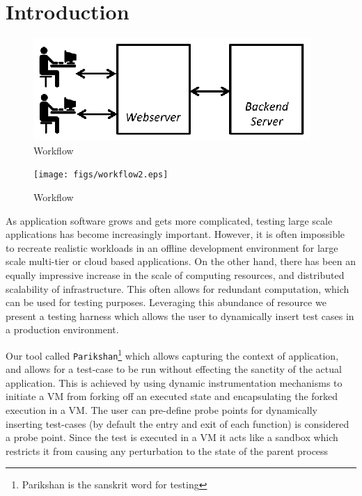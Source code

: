 
\section{Introduction}
\label{sec:intro}

\begin{figure}[t]
  \begin{center}
    \includegraphics[width=0.95\columnwidth]{figs/workflow.eps}
    \caption{Workflow}
    \label{fig:Normal workflow for most multi-tier service oriented systems}
  \end{center}
\end{figure}

\begin{figure}[t]
  \begin{center}
    \texttt{[image: figs/workflow2.eps]}
    \caption{Workflow}
    \label{fig:Backend wrapped around with Parakishan Run-time}
  \end{center}
\end{figure}

As application software grows and gets more complicated, testing large scale applications has become increasingly important. 
However, it is often impossible to recreate realistic workloads in an offline development environment for large scale multi-tier or cloud based applications.
On the other hand, there has been an equally impressive increase in the scale of computing resources, and distributed scalability of infrastructure.
This often allows for redundant computation, which can be used for testing purposes. 
Leveraging this abundance of resource we present a testing harness which allows the user to dynamically insert test cases in a production environment.

Our tool called \texttt{Parikshan}\footnote{Parikshan is the sanskrit word for testing} which allows capturing the context of application, and allows for a test-case to be run without effecting the sanctity of the actual application. 
This is achieved by using dynamic instrumentation mechanisms to initiate a VM from forking off an executed state and encapsulating the forked execution in a VM.
The user can pre-define probe points for dynamically inserting test-cases (by default the entry and exit of each function) is considered a probe point.
Since the test is executed in a VM it acts like a sandbox which restricts it from causing any perturbation to the state of the parent process


